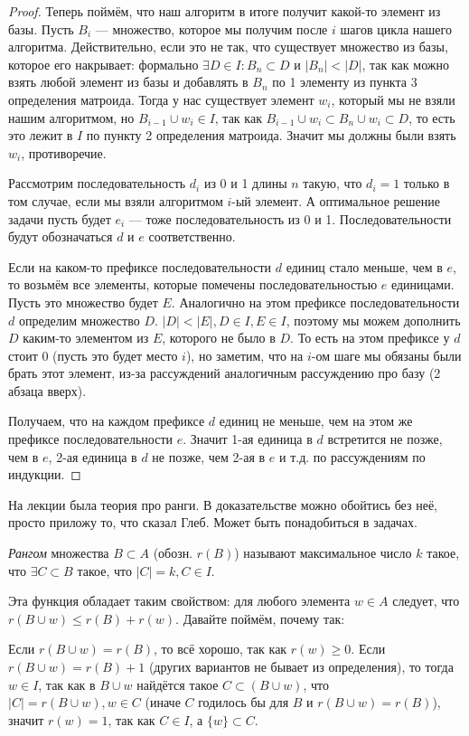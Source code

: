 \documentclass[a4paper, 12pt]{article}
\begin{document}
\begin{proof}
  Теперь поймём, что наш алгоритм в итоге получит какой-то элемент из базы.
  Пусть $B_i$ --- множество, которое мы получим после $i$ шагов цикла нашего алгоритма.
  Действительно, если это не так, что существует множество из базы, которое его
  накрывает: формально $\exists D \in I: B_n \subset D$ и $|B_n| < |D|$, так как
  можно взять любой элемент из базы и добавлять в $B_n$ по 1 элементу из пункта
  3 определения матроида. Тогда у нас существует элемент $w_i$, который мы не взяли
  нашим алгоритмом, но $B_{i - 1} \cup w_i \in I$, так как $B_{i - 1} \cup w_i \subset
  B_n \cup w_i \subset D$, то есть это лежит в $I$ по пункту 2 определения матроида.
  Значит мы должны были взять $w_i$, противоречие.

  Рассмотрим последовательность $d_i$ из 0 и 1 длины $n$ такую, что $d_i = 1$ только 
  в том случае, если мы взяли алгоритмом $i$-ый элемент. А оптимальное решение задачи
  пусть будет $e_i$ --- тоже последовательность из 0 и 1. Последовательности будут
  обозначаться $d$ и $e$ соответственно.

  Если на каком-то префиксе последовательности $d$ единиц стало меньше, чем в $e$, то
  возьмём все элементы, которые помечены последовательностью $e$ единицами. 
  Пусть это множество будет $E$. Аналогично на этом префиксе последовательности
  $d$ определим множество $D$. $|D| < |E|, D \in I, E \in I$, поэтому мы можем
  дополнить $D$ каким-то элементом из $E$, которого не было в $D$. То есть на этом
  префиксе у $d$ стоит 0 (пусть это будет место $i$), но заметим, что на $i$-ом
  шаге мы обязаны были брать этот элемент, из-за рассуждений аналогичным рассуждению
  про базу (2 абзаца вверх).

  Получаем, что на каждом префиксе $d$ единиц не меньше, чем на этом же префиксе
  последовательности $e$. Значит 1-ая единица в $d$ встретится не позже, чем в
  $e$, 2-ая единица в $d$ не позже, чем 2-ая в $e$ и т.д. по рассуждениям по
  индукции.

\end{proof}

На лекции была теория про ранги. В доказательстве можно обойтись без неё, просто
приложу то, что сказал Глеб. Может быть понадобиться в задачах.

  \textit{Рангом} множества $B \subset A$ (обозн. $r(B)$) называют максимальное
  число $k$ такое, что $\exists C \subset B$ такое, что $|C| = k, C \in I$.
  
  Эта функция обладает таким свойством: для любого элемента $w \in A$ следует, 
  что $r(B \cup w) \leqslant r(B) + r(w)$. Давайте поймём, почему так:

  Если $r(B \cup w) = r(B)$, то всё хорошо, так как $r(w) \geqslant 0$. Если
  $r(B \cup w) = r(B) + 1$ (других вариантов не бывает из определения), то тогда
  $w \in I$, так как в $B \cup w$ найдётся такое $C \subset (B\cup w)$, 
  что $|C| = r(B \cup w), w \in C$ (иначе $C$ годилось бы для $B$ и $r(B \cup w) = r(B)$), значит
  $r(w) = 1$, так как $C \in I$, а $\{w\} \subset C$.
\end{document}
